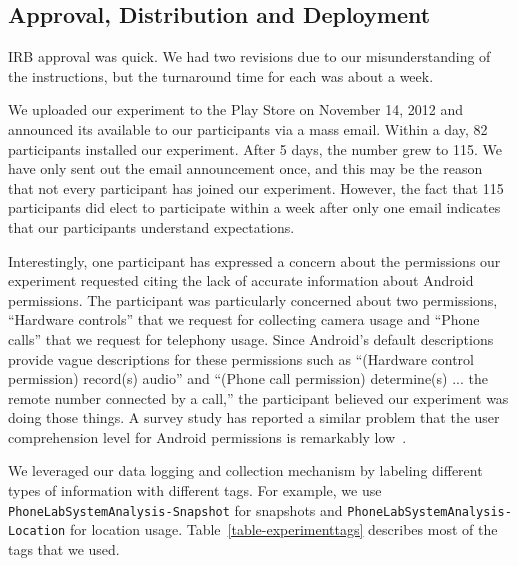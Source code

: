 \subsection{Approval, Distribution and Deployment}

IRB approval was quick. We had two revisions due to our misunderstanding of
the instructions, but the turnaround time for each was about a week.

We uploaded our experiment to the Play Store on November 14, 2012 and
announced its available to our participants via a mass email. Within a day,
82 participants installed our experiment. After 5 days, the number grew to
115. We have only sent out the email announcement once, and this may be the
reason that not every participant has joined our experiment. However, the
fact that 115 participants did elect to participate within a week after only
one email indicates that our participants understand \PhoneLab{}
expectations.

Interestingly, one participant has expressed a concern about the permissions
our experiment requested citing the lack of accurate information about
Android permissions. The participant was particularly concerned about two
permissions, ``Hardware controls'' that we request for collecting camera
usage and ``Phone calls'' that we request for telephony usage. Since
Android's default descriptions provide vague descriptions for these
permissions such as ``(Hardware control permission) record(s) audio'' and
``(Phone call permission) determine(s) ... the remote number connected by a
call,'' the participant believed our experiment was doing those things. A
survey study has reported a similar problem that the user comprehension level
for Android permissions is remarkably low~\cite{felt:soups:2012}.

We leveraged our data logging and collection mechanism by labeling different
types of information with different tags. For example, we use
\texttt{PhoneLabSystemAnalysis-Snapshot} for snapshots and
\texttt{PhoneLabSystemAnalysis-Location} for location usage.
Table~\ref{table-experimenttags} describes most of the tags that we used.
